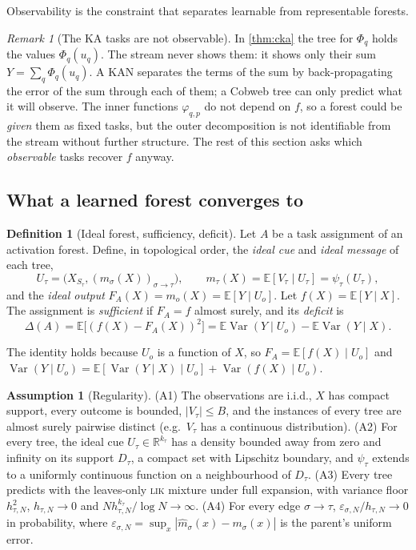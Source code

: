 \documentclass[11pt]{article}
\theoremstyle{definition}
\newtheorem{definition}[theorem]{Definition}
\newtheorem{assumption}[theorem]{Assumption}
\theoremstyle{remark}
\newtheorem{remark}[theorem]{Remark}
\newcommand{\R}{\mathbb{R}}
\newcommand{\E}{\mathbb{E}}
\newcommand{\Var}{\operatorname{Var}}
\begin{document}
Observability is the constraint that separates learnable from representable forests.

\begin{remark}[The KA tasks are not observable]\label{rem:kaobs}
In \cref{thm:cka} the tree for $\Phi_q$ holds the values $\Phi_q(u_q)$.  The stream
never shows them: it shows only their sum $Y=\sum_q\Phi_q(u_q)$.  A KAN separates the
terms of the sum by back-propagating the error of the sum through each of them; a Cobweb
tree can only predict what it will observe.  The inner functions $\varphi_{q,p}$ do not
depend on $f$, so a forest could be \emph{given} them as fixed tasks, but the outer
decomposition is not identifiable from the stream without further structure.  The rest
of this section asks which \emph{observable} tasks recover $f$ anyway.
\end{remark}

\subsection{What a learned forest converges to}

\begin{definition}[Ideal forest, sufficiency, deficit]\label{def:ideal}
Let $A$ be a task assignment of an activation forest.  Define, in topological order,
the \emph{ideal cue} and \emph{ideal message} of each tree,
\[
  U_\tau=\bigl(X_{S_\tau},(m_\sigma(X))_{\sigma\to\tau}\bigr),\qquad
  m_\tau(X)=\E[V_\tau\mid U_\tau]=\psi_\tau(U_\tau),
\]
and the \emph{ideal output} $F_A(X)=m_o(X)=\E[Y\mid U_o]$.  Let $f(X)=\E[Y\mid X]$.  The
assignment is \emph{sufficient} if $F_A=f$ almost surely, and its \emph{deficit} is
\[
  \Delta(A)=\E\bigl[(f(X)-F_A(X))^2\bigr]=\E\Var(Y\mid U_o)-\E\Var(Y\mid X).
\]
\end{definition}

The identity holds because $U_o$ is a function of $X$, so $F_A=\E[f(X)\mid U_o]$ and
$\Var(Y\mid U_o)=\E[\Var(Y\mid X)\mid U_o]+\Var(f(X)\mid U_o)$.

\begin{assumption}[Regularity]\label{ass:regular}
(A1) The observations are i.i.d., $X$ has compact support, every outcome is bounded,
$|V_\tau|\le B$, and the instances of every tree are almost surely pairwise distinct
(e.g.\ $V_\tau$ has a continuous distribution).  (A2) For every tree, the ideal cue
$U_\tau\in\R^{k_\tau}$ has a density bounded away from zero and infinity on its support
$D_\tau$, a compact set with Lipschitz boundary, and $\psi_\tau$ extends to a uniformly
continuous function on a neighbourhood of $D_\tau$.  (A3) Every tree predicts with the leaves-only \textsc{lik}
mixture under full expansion, with variance floor $h_{\tau,N}^2$, $h_{\tau,N}\to0$ and
$Nh_{\tau,N}^{k_\tau}/\log N\to\infty$.  (A4) For every edge $\sigma\to\tau$,
$\varepsilon_{\sigma,N}/h_{\tau,N}\to0$ in probability, where
$\varepsilon_{\sigma,N}=\sup_x|\hat m_\sigma(x)-m_\sigma(x)|$ is the parent's uniform
error.
\end{assumption}
\end{document}

